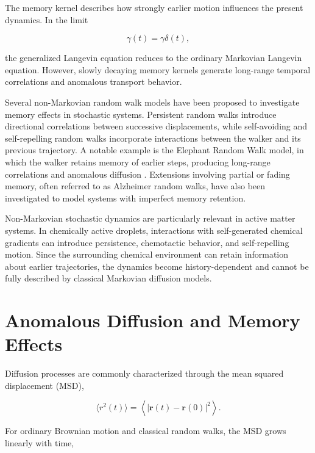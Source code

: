 The memory kernel describes how strongly earlier motion influences the present dynamics. In the limit

\begin{equation}
\gamma(t)=\gamma\delta(t),
\end{equation}

the generalized Langevin equation reduces to the ordinary Markovian Langevin equation. However, slowly decaying memory kernels generate long-range temporal correlations and anomalous transport behavior.

Several non-Markovian random walk models\cite{schutz2004} have been proposed to investigate memory effects in stochastic systems. Persistent random walks introduce directional correlations between successive displacements, while self-avoiding and self-repelling random walks incorporate interactions between the walker and its previous trajectory. A notable example is the Elephant Random Walk model\cite{schutz2004}, in which the walker retains memory of earlier steps, producing long-range correlations and anomalous diffusion \cite{schutz2004}. Extensions involving partial or fading memory, often referred to as Alzheimer random walks, have also been investigated to model systems with imperfect memory retention.

Non-Markovian stochastic dynamics are particularly relevant in active matter systems\cite{hokmabad2022,droplet2025}. In chemically active droplets, interactions with self-generated chemical gradients can introduce persistence, chemotactic behavior, and self-repelling motion. Since the surrounding chemical environment can retain information about earlier trajectories, the dynamics become history-dependent and cannot be fully described by classical Markovian diffusion models.

\section{Anomalous Diffusion and Memory Effects}

Diffusion processes are commonly characterized through the mean squared displacement (MSD)\cite{klafter2011},

\begin{equation}
\langle r^2(t)\rangle
=
\left\langle
|\mathbf r(t)-\mathbf r(0)|^2
\right\rangle.
\end{equation}

For ordinary Brownian motion and classical random walks, the MSD grows linearly with time\cite{klafter2011},

